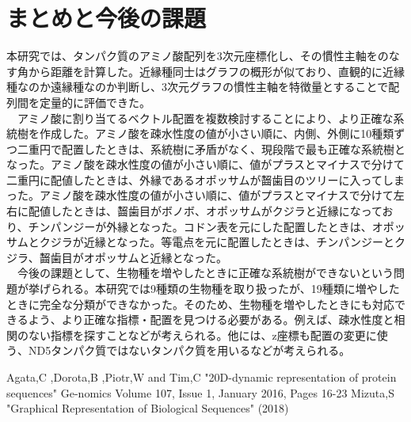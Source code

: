 \documentclass[a4paper,12pt]{jsreport}
\begin{document}
\chapter{まとめと今後の課題}
本研究では、タンパク質のアミノ酸配列を3次元座標化し、その慣性主軸をのなす角から距離を計算した。近縁種同士はグラフの概形が似ており、直観的に近縁種なのか遠縁種なのか判断し、3次元グラフの慣性主軸を特徴量とすることで配列間を定量的に評価できた。\\
　アミノ酸に割り当てるベクトル配置を複数検討することにより、より正確な系統樹を作成した。アミノ酸を疎水性度の値が小さい順に、内側、外側に10種類ずつ二重円で配置したときは、系統樹に矛盾がなく、現段階で最も正確な系統樹となった。アミノ酸を疎水性度の値が小さい順に、値がプラスとマイナスで分けて二重円に配値したときは、外縁であるオポッサムが齧歯目のツリーに入ってしまった。アミノ酸を疎水性度の値が小さい順に、値がプラスとマイナスで分けて左右に配値したときは、齧歯目がボノボ、オポッサムがクジラと近縁になっており、チンパンジーが外縁となった。コドン表を元にした配置したときは、オポッサムとクジラが近縁となった。等電点を元に配置したときは、チンパンジーとクジラ、齧歯目がオポッサムと近縁となった。\\
　今後の課題として、生物種を増やしたときに正確な系統樹ができないという問題が挙げられる。本研究では9種類の生物種を取り扱ったが、19種類に増やしたときに完全な分類ができなかった。そのため、生物種を増やしたときにも対応できるよう、より正確な指標・配置を見つける必要がある。例えば、疎水性度と相関のない指標を探すことなどが考えられる。他には、z座標も配置の変更に使う、ND5タンパク質ではないタンパク質を用いるなどが考えられる。

\begin{thebibliography}{9}
 Agata,C ,Dorota,B ,Piotr,W and Tim,C "20D-dynamic representation of protein sequences" Ge-nomics Volume 107, Issue 1, January 2016, Pages 16-23
 Mizuta,S "Graphical Representation of Biological Sequences" (2018)
\end{thebibliography}
\end{document}
